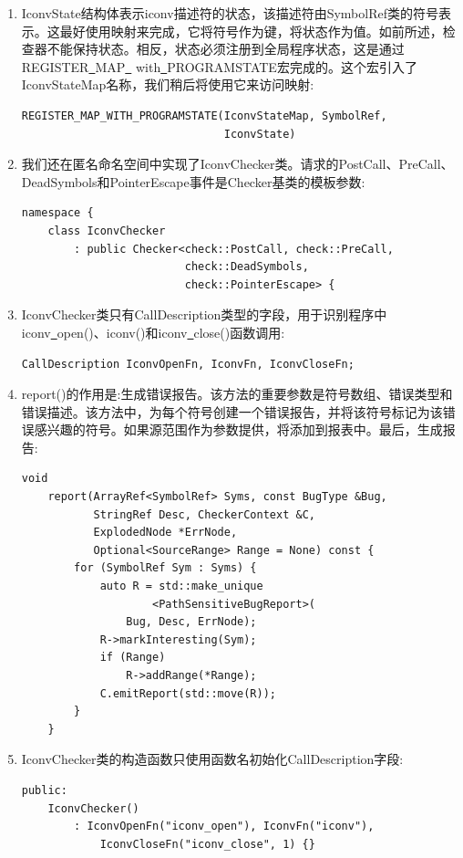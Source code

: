 \begin{enumerate}
\item IconvState结构体表示iconv描述符的状态，该描述符由SymbolRef类的符号表示。这最好使用映射来完成，它将符号作为键，将状态作为值。如前所述，检查器不能保持状态。相反，状态必须注册到全局程序状态，这是通过REGISTER\underline{~}MAP\underline{~} with\underline{~}PROGRAMSTATE宏完成的。这个宏引入了IconvStateMap名称，我们稍后将使用它来访问映射:
\begin{lstlisting}[caption={}]
REGISTER_MAP_WITH_PROGRAMSTATE(IconvStateMap, SymbolRef,
							   IconvState)
\end{lstlisting}

\item 我们还在匿名命名空间中实现了IconvChecker类。请求的PostCall、PreCall、DeadSymbols和PointerEscape事件是Checker基类的模板参数:
\begin{lstlisting}[caption={}]
namespace {
	class IconvChecker
		: public Checker<check::PostCall, check::PreCall,
						 check::DeadSymbols,
						 check::PointerEscape> {
\end{lstlisting}

\item IconvChecker类只有CallDescription类型的字段，用于识别程序中iconv\underline{~}open()、iconv()和iconv\underline{~}close()函数调用:
\begin{lstlisting}[caption={}]
	CallDescription IconvOpenFn, IconvFn, IconvCloseFn;
\end{lstlisting}

\item report()的作用是:生成错误报告。该方法的重要参数是符号数组、错误类型和错误描述。该方法中，为每个符号创建一个错误报告，并将该符号标记为该错误感兴趣的符号。如果源范围作为参数提供，将添加到报表中。最后，生成报告:
\begin{lstlisting}[caption={}]
	void
	report(ArrayRef<SymbolRef> Syms, const BugType &Bug,
		   StringRef Desc, CheckerContext &C,
		   ExplodedNode *ErrNode,
		   Optional<SourceRange> Range = None) const {
		for (SymbolRef Sym : Syms) {
			auto R = std::make_unique
					<PathSensitiveBugReport>(
				Bug, Desc, ErrNode);
			R->markInteresting(Sym);
			if (Range)
				R->addRange(*Range);
			C.emitReport(std::move(R));
		}
	}
\end{lstlisting}

\item IconvChecker类的构造函数只使用函数名初始化CallDescription字段:
\begin{lstlisting}[caption={}]
public:
	IconvChecker()
		: IconvOpenFn("iconv_open"), IconvFn("iconv"),
			IconvCloseFn("iconv_close", 1) {}
\end{lstlisting}


\end{enumerate}
